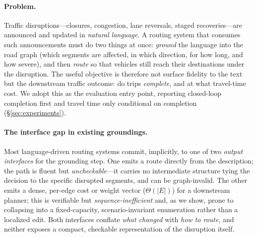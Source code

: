 
\paragraph{Problem.}
Traffic disruptions---closures, congestion, lane reversals, staged recoveries---are announced and
updated in \emph{natural language}. A routing system that consumes such announcements must do two
things at once: \emph{ground} the language into the road graph (which segments are affected, in which
direction, for how long, and how severe), and then \emph{route} so that vehicles still reach their
destinations under the disruption. The useful objective is therefore not surface fidelity to the text
but the downstream traffic outcome: do trips \emph{complete}, and at what travel-time cost. We adopt
this as the evaluation entry point, reporting closed-loop completion first and travel time only
conditional on completion (\S\ref{sec:experiments}).

\paragraph{The interface gap in existing groundings.}
Most language-driven routing systems commit, implicitly, to one of two \emph{output interfaces} for the
grounding step. One emits a route directly from the description; the path is fluent but
\emph{uncheckable}---it carries no intermediate structure tying the decision to the specific disrupted
segments, and can be graph-invalid. The other emits a dense, per-edge cost or weight vector
($\Theta(|E|)$) for a downstream planner; this is verifiable but \emph{sequence-inefficient} and, as we
show, prone to collapsing into a fixed-capacity, scenario-invariant enumeration rather than a localized
edit. Both interfaces conflate \emph{what changed} with \emph{how to route}, and neither exposes a
compact, checkable representation of the disruption itself.

